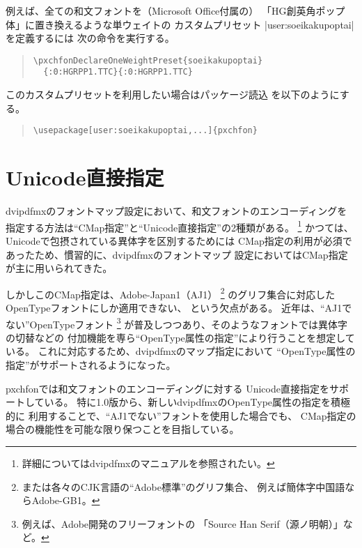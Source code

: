\documentclass[uplatex,dvipdfmx,a4paper]{jsarticle}
\newcommand{\Pkg}[1]{\textsf{#1}}
\begin{document}
例えば、全ての和文フォントを（Microsoft Office付属の）
「HG創英角ポップ体」に置き換えるような単ウェイトの
カスタムプリセット |user:soeikakupoptai| を定義するには
次の命令を実行する。
\begin{quote}\small\begin{verbatim}                                      
\pxchfonDeclareOneWeightPreset{soeikakupoptai}
  {:0:HGRPP1.TTC}{:0:HGRPP1.TTC}
\end{verbatim}\end{quote}

このカスタムプリセットを利用したい場合はパッケージ読込
を以下のようにする。
\begin{quote}\small\begin{verbatim}                                      
\usepackage[user:soeikakupoptai,...]{pxchfon}
\end{verbatim}\end{quote}


\section{Unicode直接指定}
\label{sec:DirectUnicode}

dvipdfmxのフォントマップ設定において、和文フォントのエンコーディングを
指定する方法は“CMap指定”と“Unicode直接指定”の2種類がある。
\footnote{詳細についてはdvipdfmxのマニュアルを参照されたい。}
かつては、Unicodeで包摂されている異体字を区別するためには
CMap指定の利用が必須であったため、慣習的に、dvipdfmxのフォントマップ
設定においてはCMap指定が主に用いられてきた。

しかしこのCMap指定は、Adobe-Japan1（AJ1）%
\footnote{または各々のCJK言語の“Adobe標準”のグリフ集合、
例えば簡体字中国語ならAdobe-GB1。}%
のグリフ集合に対応したOpenTypeフォントにしか適用できない、
という欠点がある。
近年は、“AJ1でない”OpenTypeフォント
\footnote{例えば、Adobe開発のフリーフォントの
「Source Han Serif（源ノ明朝）」など。}%
が普及しつつあり、そのようなフォントでは異体字の切替などの
付加機能を専ら“OpenType属性の指定”により行うことを想定している。
これに対応するため、dvipdfmxのマップ指定において
“OpenType属性の指定”がサポートされるようになった。

\Pkg{pxchfon}では和文フォントのエンコーディングに対する
Unicode直接指定をサポートしている。
特に1.0版から、新しいdvipdfmxのOpenType属性の指定を積極的に
利用することで、“AJ1でない”フォントを使用した場合でも、
CMap指定の場合の機能性を可能な限り保つことを目指している。
\end{document}
